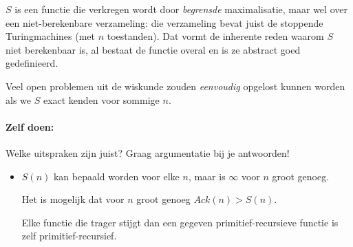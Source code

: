 $S$ is een functie die verkregen wordt door {\em begrensde}
maximalisatie, maar wel over een niet-berekenbare verzameling: die
verzameling bevat juist de stoppende Turingmachines (met $n$
toestanden). Dat vormt de inherente reden waarom $S$ niet
berekenbaar is, al bestaat de functie overal en is ze abstract
goed gedefinieerd.  

Veel open problemen uit de wiskunde zouden {\em eenvoudig} opgelost
kunnen worden als we $S$ exact kenden voor sommige $n$.


\paragraph{Zelf doen:} Welke uitspraken zijn juist? Graag argumentatie bij je antwoorden!
\begin{itemize}
\item[] $S(n)$ kan bepaald worden voor elke $n$, maar is $\infty$
voor $n$ groot genoeg.

Het is mogelijk dat voor $n$ groot genoeg $Ack(n) > S(n)$.

Elke functie die trager stijgt dan een gegeven primitief-recursieve
functie is zelf primitief-recursief.
\end{itemize}

